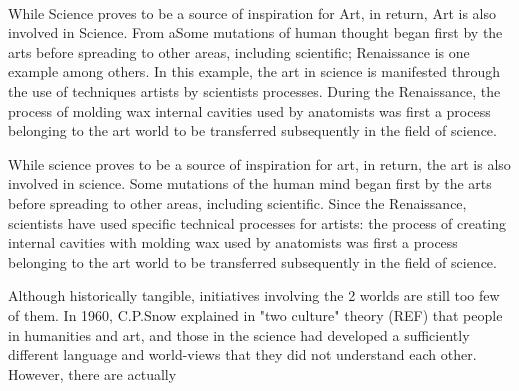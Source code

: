 \begin{figure}[]
\centering
    \\
    \hfil
    \caption{}
    \label{fig:chronophotography_history}
\end{figure}

While Science proves to be a source of inspiration for Art, in return, Art is also involved in Science. From aSome mutations of human thought began first by the arts before spreading to other areas, including scientific; Renaissance is one example among others. In this example, the art in science is manifested through the use of techniques artists by scientists processes. During the Renaissance, the process of molding wax internal cavities used by anatomists was first a process belonging to the art world to be transferred subsequently in the field of science.


While science proves to be a source of inspiration for art, in return, the art is also involved in science. Some mutations of the human mind began first by the arts before spreading to other areas, including scientific. Since the Renaissance, scientists have used specific technical processes for artists: the process of creating internal cavities with molding wax used by anatomists was first a process belonging to the art world to be transferred subsequently in the field of science.

Although historically tangible, initiatives involving the 2 worlds are still too few of them. In 1960, C.P.Snow explained in "two culture" theory (REF) that people in humanities and art, and those in the science had developed a sufficiently different language and world-views that they did not understand each other. However, there are actually

